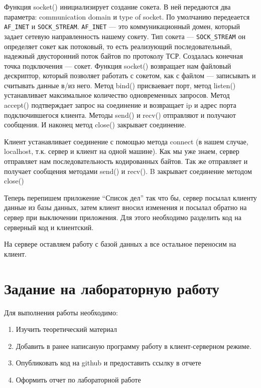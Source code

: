 \documentclass[a4paper]{article}
\begin{document}
Функция socket() инициализирует создание сокета. В ней передаются два параметра: communication domain и type of socket. По умолчанию передеается \verb!AF_INET! и \verb!SOCK_STREAM!. \verb!AF_INET! --- это коммуникационный домен, который задает сетевую направленность нашему сокету. Тип сокета --- \verb!SOCK_STREAM! он определяет сокет как потоковый, то есть реализующий последовательный, надежный двусторонний поток байтов по протоколу ТСР. Создалась конечная точка подключения --- сокет. Функция socket() возвращает нам файловый дескриптор, который позволяет работать с сокетом, как с файлом — записывать и считывать данные в/из него. Метод bind() присваевает порт, метод listen() устанавливает максимальное количество одновременных  запросов. Метод accept() подтверждает запрос на соединение и возвращает ip и адрес порта подключившегося клиента. Методы send() и recv() отправляют и получают сообщения. И наконец метод close() закрывает соединение.

Клиент устанавливает соединение с помощью метода connect (в нашем случае, localhost, т.к. сервер и клиент на одной машине). Как мы уже знаем, сервер отправляет нам последовательность кодированных байтов. Так же отправляет и получает сообщения методами send() и recv(). B закрывает соединение методом close()

Теперь перепишем приложение ``Список дел'' так что бы, сервер посылал клиенту данные из базы данных, затем клиент вносил изменения и посылал обратно на сервер при выключении приложения. Для этого необходимо разделить код на серверный код и клиентский.

На сервере оставляем работу с базой данных а все остальное переносим на клиент.






\newpage
\section{Задание на лабораторную работу}

Для выполнения работы необходимо:
\begin{enumerate}
  \item Изучить теоретический материал
  \item Добавить в ранее написаную программу работу в клиент-серверном режиме.
  \item Опубликовать код на github и предоставить ссылку в отчете
  \item Оформить отчет по лабораторной работе
\end{enumerate}
\end{document}
